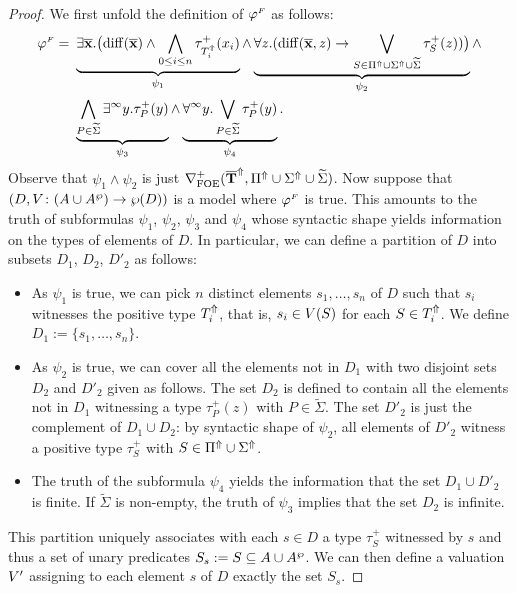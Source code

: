 \begin{proof}
We first unfold the definition of $\varphi^{\fin}$ as follows:
\begin{equation}\label{eq:unfoldingNablaolque}
\begin{aligned}
\varphi^{\fin} =\ &
\underbrace{
    \exists \vlist{x}.\big(\arediff{\vlist{x}} \land \bigwedge_{0 \leq i \leq n} \tau^+_{\lift{T}_i}(x_i)
}_{\psi_1}
\land \underbrace{
    \forall z.(\arediff{\vlist{x},z} \lthen \bigvee_{S\in \lift{\Pi} \cup \lift{\Sigma} \cup \widetilde{\Sigma}} \tau^+_S(z))\big)
}_{\psi_2}
\land
\\ & \underbrace{
    \bigwedge_{P\in\widetilde{\Sigma}} \qu y.{\tau}^{+}_P(y)
}_{\psi_3} \land
 \underbrace{
    \dqu y.\bigvee_{P\in\widetilde{\Sigma}} {\tau}^{+}_P(y)
}_{\psi_4} .
\end{aligned}
\end{equation}
Observe that $\psi_1 \land \psi_2$ is just $\mondbnfofoe{\lift{\vlist{T}}}{\lift{\Pi} \cup \lift{\Sigma} \cup \widetilde{\Sigma}}{+}$. Now suppose that $(D,\val \: (A \cup \shA ) \to \wp(D))$ is a model where $\varphi^{\fin}$ is true. This amounts to the truth of subformulas $\psi_1$, $\psi_2$, $\psi_3$ and $\psi_4$ whose syntactic shape yields information on the types of elements of $D$. In particular, we can define a partition of $D$ into subsets $D_1$, $D_2$, $D'_2$ as follows:
\begin{itemize}
  \item As $\psi_1$ is true, we can pick $n$ distinct elements $s_1,\dots,s_n$ of $D$ such that $s_i$ witnesses the positive type $\lift{T}_i$, %
   that is, $s_i \in \val(S)$ for each $S \in \lift{T}_i$. We define $D_1 := \{s_1,\dots,s_n\}$.
  \item  As $\psi_2$ is true, we can cover all the elements not in $D_1$ with two disjoint sets $D_2$ and $D'_2$ given as follows. The set $D_2$ is defined to contain all the elements not in $D_1$ witnessing a type ${\tau}^{+}_P(z)$ with $P \in \widetilde{\Sigma}$. The set $D'_2$ is just the complement of $D_1 \cup D_2$: by syntactic shape of $\psi_2$, all elements of $D'_2$ witness a positive type ${\tau}^{+}_S$ with
  $S \in \lift{\Pi} \cup \lift{\Sigma}$.
  \item The truth of the subformula $\psi_4$ yields the information that the set $D_1 \cup D'_2$ is finite. If $\widetilde{\Sigma}$ is non-empty, the truth of $\psi_3$ implies that the set $D_2$ is infinite.
 \end{itemize}
This partition uniquely associates with each $s \in D$ a type ${\tau}^{+}_S$ witnessed by $s$ and thus a set of unary predicates $S_s := S \subseteq A \cup \shA$. We can then define a valuation $\val'$ assigning to each element $s$ of $D$ exactly the set $S_s$.


\end{proof}
